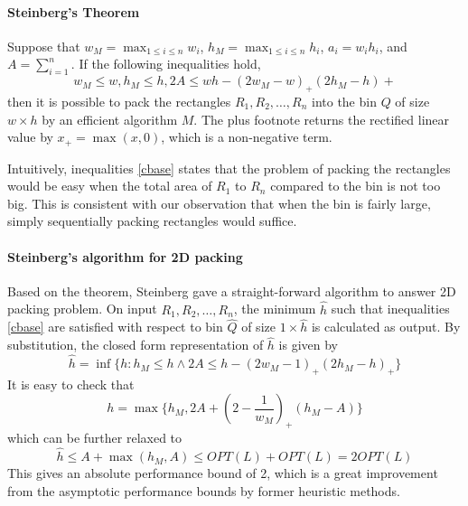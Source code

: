 \documentclass[sigplan,screen,nonacm]{acmart}\settopmatter{printfolios=true,printccs=false,printacmref=false}
\begin{document}
\paragraph{Steinberg's Theorem} Suppose that $w_M=\max_{1\leq i\leq n}w_i$, $h_M=\max_{1\leq i\leq n}h_i$, $a_i=w_ih_i$, and $A=\sum_{i=1}^{n}$. If the following inequalities hold,
\begin{equation}
	w_M\leq w, h_M\leq h, 2A\leq wh-(2w_M-w)_+(2h_M-h)+ 
	\label{cbase}
\end{equation}
then it is possible to pack the rectangles $R_1, R_2, \ldots, R_n$ into the bin $Q$ of size $w\times h$ by an efficient algorithm $M$\cite{steinberg1997strip}. The plus footnote returns the rectified linear value by $x_+=\max(x,0)$, which is a non-negative term.
\par Intuitively, inequalities \ref{cbase} states that the problem of packing the rectangles would be easy when the total area of $R_1$ to $R_n$ compared to the bin is not too big. This is consistent with our observation that when the bin is fairly large, simply sequentially packing rectangles would suffice.
\paragraph{Steinberg's algorithm for 2D packing} Based on the theorem, Steinberg gave a straight-forward algorithm to answer 2D packing problem. On input $R_1, R_2, \ldots, R_n$, the minimum $\hat{h}$ such that inequalities \ref{cbase} are satisfied with respect to bin $\hat{Q}$ of size $1\times \hat{h}$ is calculated as output. By substitution, the closed form representation of $\hat{h}$ is given by
\begin{equation}
	\hat{h}=\inf\{h:h_M\leq h \wedge 2A\leq h-(2w_M-1)_+(2h_M-h)_+\}
\end{equation}
It is easy to check that
\begin{equation}
	h=\max\{h_M, 2A+(2-\frac{1}{w_M})_+(h_M-A)\}
\end{equation}
which can be further relaxed to
\begin{equation}
	\hat{h}\leq A+\max(h_M, A)\leq OPT(L)+OPT(L)=2OPT(L)
\end{equation}
This gives an absolute performance bound of 2, which is a great improvement from the asymptotic performance bounds by former heuristic methods.
\end{document}
